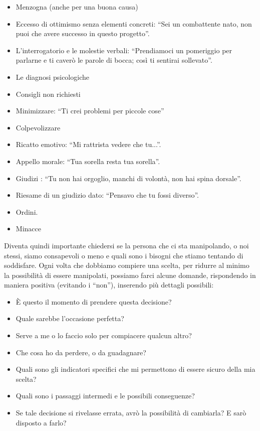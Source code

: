 \documentclass[12pt]{book} %
\begin{document}
\begin{itemize}
\item Menzogna (anche per una buona causa) 
\item Eccesso di ottimismo senza elementi concreti: “Sei un combattente nato, non puoi che avere successo in questo
progetto”. 
\item L'interrogatorio e le molestie verbali: “Prendiamoci un pomeriggio per parlarne e ti caverò
le parole di bocca; così ti sentirai sollevato”. 
\item Le diagnosi psicologiche
\item Consigli non richiesti
\item Minimizzare: “Ti crei problemi per piccole cose”
\item Colpevolizzare
\item Ricatto emotivo: “Mi rattrista vedere che tu...”. 
\item Appello morale: “Tua sorella resta tua sorella”. 
\item Giudizi : “Tu non hai orgoglio, manchi di volontà, non hai spina dorsale”. 
\item Riesame di un giudizio dato: “Pensavo che tu fossi diverso”. 
\item Ordini. 
\item Minacce
\end{itemize}

\bigskip

Diventa quindi importante chiedersi se la persona che ci sta manipolando, o noi stessi, siamo consapevoli o meno e quali
sono i bisogni che stiamo tentando di soddisfare.
\newline
\newline
Ogni volta che dobbiamo compiere una scelta, per ridurre al minimo la possibilità di essere manipolati, possiamo farci
alcune domande, rispondendo in maniera positiva (evitando i “non”), inserendo più dettagli possibili:

\begin{itemize}
\item È questo il momento di prendere questa decisione? 
\item Quale sarebbe l'occasione perfetta?
\item Serve a me o lo faccio solo per compiacere qualcun altro? 
\item Che cosa ho da perdere, o da guadagnare? 
\item Quali sono gli indicatori specifici che mi permettono di essere sicuro della mia scelta? 
\item Quali sono i passaggi intermedi e le possibili conseguenze? 
\item Se tale decisione si rivelasse errata, avrò la possibilità di cambiarla? E sarò disposto a farlo?
\end{itemize}
\end{document}
